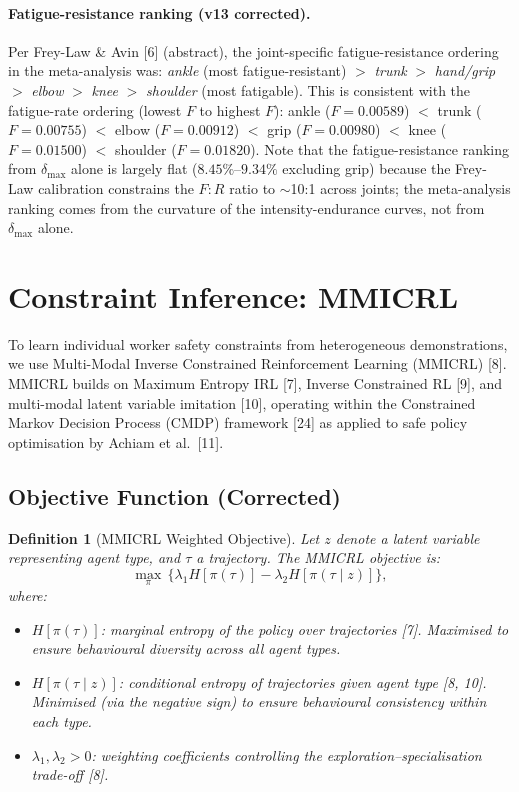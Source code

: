 \documentclass[11pt,a4paper]{article}
\newtheorem{definition}[theorem]{Definition}
\begin{document}
\paragraph{Fatigue-resistance ranking (v13 corrected).} Per Frey-Law
\& Avin [6] (abstract), the joint-specific fatigue-resistance ordering
in the meta-analysis was: \emph{ankle} (most fatigue-resistant) $>$
\emph{trunk} $>$ \emph{hand/grip} $>$ \emph{elbow} $>$ \emph{knee} $>$
\emph{shoulder} (most fatigable). This is consistent with the
fatigue-rate ordering (lowest $F$ to highest $F$): ankle ($F=0.00589$)
$<$ trunk ($F=0.00755$) $<$ elbow ($F=0.00912$) $<$ grip ($F=0.00980$)
$<$ knee ($F=0.01500$) $<$ shoulder ($F=0.01820$). Note that the
fatigue-resistance ranking from $\delta_{\max}$ alone is largely flat
($8.45\%$--$9.34\%$ excluding grip) because the Frey-Law calibration
constrains the $F{:}R$ ratio to $\sim$10:1 across joints; the
meta-analysis ranking comes from the curvature of the
intensity-endurance curves, not from $\delta_{\max}$ alone.

\section{Constraint Inference: MMICRL}\label{sec:mmicrl}

To learn individual worker safety constraints from heterogeneous
demonstrations, we use Multi-Modal Inverse Constrained Reinforcement
Learning (MMICRL) [8]. MMICRL builds on Maximum Entropy IRL [7],
Inverse Constrained RL [9], and multi-modal latent variable imitation
[10], operating within the Constrained Markov Decision Process (CMDP)
framework [24] as applied to safe policy optimisation by Achiam et
al.\ [11].

\subsection{Objective Function (Corrected)}

\begin{definition}[MMICRL Weighted Objective]
Let $z$ denote a latent variable representing agent type, and $\tau$
a trajectory. The MMICRL objective is:
\begin{equation}\label{eq:mmicrl}
\max_{\pi}\, \bigl\{ \lambda_1 H[\pi(\tau)] - \lambda_2 H[\pi(\tau \mid z)] \bigr\},
\end{equation}
where:
\begin{itemize}[noitemsep]
\item $H[\pi(\tau)]$: marginal entropy of the policy over trajectories [7]. Maximised to ensure behavioural diversity across all agent types.
\item $H[\pi(\tau \mid z)]$: conditional entropy of trajectories given agent type [8, 10]. Minimised (via the negative sign) to ensure behavioural consistency within each type.
\item $\lambda_1, \lambda_2 > 0$: weighting coefficients controlling the exploration--specialisation trade-off [8].
\end{itemize}
\end{definition}
\end{document}

